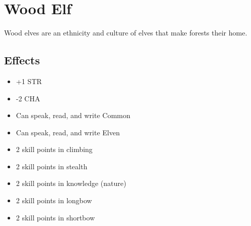 \section{Wood Elf}\label{culture:wood-elf}
Wood elves are an ethnicity and culture of elves that make forests their
home.

\subsection{Effects}
\begin{itemize}
    \item +1 STR
    \item -2 CHA
    \item Can speak, read, and write Common
    \item Can speak, read, and write Elven
    \item 2 skill points in climbing
    \item 2 skill points in stealth
    \item 2 skill points in knowledge (nature)
    \item 2 skill points in longbow
    \item 2 skill points in shortbow
\end{itemize}
